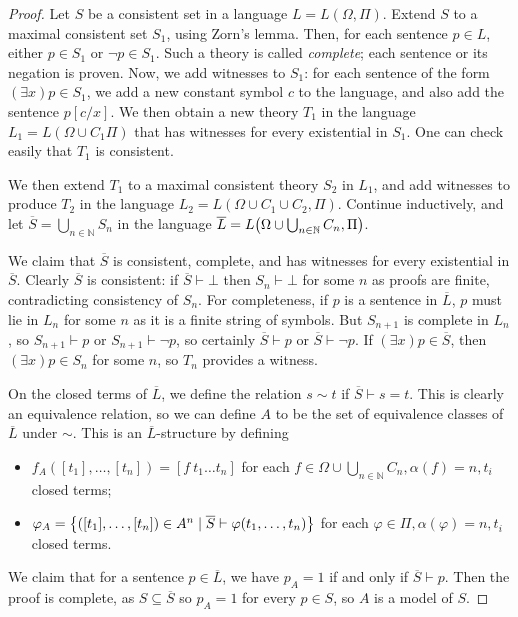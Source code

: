 \begin{proof}
    Let \( S \) be a consistent set in a language \( L = L(\Omega, \Pi) \).
    Extend \( S \) to a maximal consistent set \( S_1 \), using Zorn's lemma.
    Then, for each sentence \( p \in L \), either \( p \in S_1 \) or \( \neg p \in S_1 \).
    Such a theory is called \emph{complete}; each sentence or its negation is proven.
    Now, we add witnesses to \( S_1 \): for each sentence of the form \( (\exists x)p \in S_1 \), we add a new constant symbol \( c \) to the language, and also add the sentence \( p[c/x] \).
    We then obtain a new theory \( T_1 \) in the language \( L_1 = L(\Omega \cup C_1 \Pi) \) that has witnesses for every existential in \( S_1 \).
    One can check easily that \( T_1 \) is consistent.

    We then extend \( T_1 \) to a maximal consistent theory \( S_2 \) in \( L_1 \), and add witnesses to produce \( T_2 \) in the language \( L_2 = L(\Omega \cup C_1 \cup C_2, \Pi) \).
    Continue inductively, and let \( \overline S = \bigcup_{n \in \mathbb N} S_n \) in the language \( \overline L = L\qty(\Omega \cup \bigcup_{n \in \mathbb N} C_n, \Pi) \).

    We claim that \( \overline S \) is consistent, complete, and has witnesses for every existential in \( \overline S \).
    Clearly \( \overline S \) is consistent: if \( \overline S \vdash \bot \) then \( S_n \vdash \bot \) for some \( n \) as proofs are finite, contradicting consistency of \( S_n \).
    For completeness, if \( p \) is a sentence in \( \overline L \), \( p \) must lie in \( L_n \) for some \( n \) as it is a finite string of symbols.
    But \( S_{n+1} \) is complete in \( L_n \), so \( S_{n+1} \vdash p \) or \( S_{n+1} \vdash \neg p \), so certainly \( \overline S \vdash p \) or \( \overline S \vdash \neg p \).
    If \( (\exists x)p \in \overline S \), then \( (\exists x)p \in S_n \) for some \( n \), so \( T_n \) provides a witness.

    On the closed terms of \( \overline L \), we define the relation \( s \sim t \) if \( \overline S \vdash s = t \).
    This is clearly an equivalence relation, so we can define \( A \) to be the set of equivalence classes of \( \overline L \) under \( \sim \).
    This is an \( \overline L \)-structure by defining
    \begin{itemize}
        \item \( f_A([t_1], \dots, [t_n]) = [f\ t_1 \dots t_n] \) for each \( f \in \Omega \cup \bigcup_{n \in \mathbb N} C_n, \alpha(f) = n, t_i \) closed terms;
        \item \( \varphi_A = \qty{([t_1], \dots, [t_n]) \in A^n \mid \overline S \vdash \varphi(t_1, \dots, t_n)} \) for each \( \varphi \in \Pi, \alpha(\varphi) = n, t_i \) closed terms.
    \end{itemize}
    We claim that for a sentence \( p \in \overline L \), we have \( p_A = 1 \) if and only if \( \overline S \vdash p \).
    Then the proof is complete, as \( S \subseteq \overline S \) so \( p_A = 1 \) for every \( p \in S \), so \( A \) is a model of \( S \).


\end{proof}
